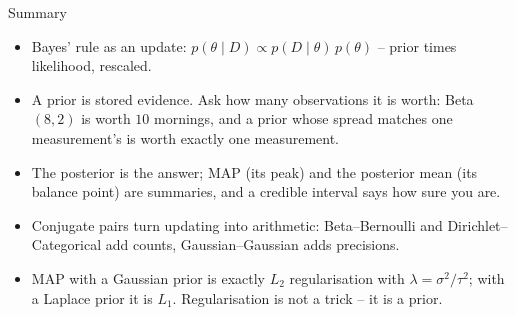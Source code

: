 \begin{frame}{Summary}
\begin{itemize}
  \item Bayes' rule as an update: $p(\theta \mid D) \propto p(D \mid \theta)\,p(\theta)$ -- prior times likelihood, rescaled.
  \pause
  \item A prior is stored evidence. Ask how many observations it is worth: Beta$(8,2)$ is worth $10$ mornings, and a prior whose spread matches one measurement's is worth exactly one measurement.
  \pause
  \item The posterior is the answer; MAP (its peak) and the posterior mean (its balance point) are summaries, and a credible interval says how sure you are.
  \pause
  \item Conjugate pairs turn updating into arithmetic: Beta--Bernoulli and Dirichlet--Categorical add counts, Gaussian--Gaussian adds precisions.
  \pause
  \item MAP with a Gaussian prior is exactly $L_2$ regularisation with $\lambda = \sigma^2/\tau^2$; with a Laplace prior it is $L_1$. Regularisation is not a trick -- it is a prior.
\end{itemize}
\end{frame}
